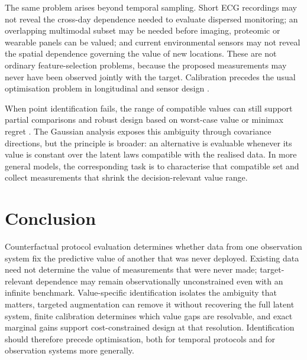 The same problem arises beyond temporal sampling. Short ECG recordings may not
reveal the cross-day dependence needed to evaluate dispersed monitoring; an
overlapping multimodal subset may be needed before imaging, proteomic or
wearable panels can be valued; and current environmental sensors may not reveal
the spatial dependence governing the value of new locations. These are not
ordinary feature-selection problems, because the proposed measurements may
never have been observed jointly with the target. Calibration precedes the
usual optimisation problem in longitudinal and sensor design
\citep{chaloner1995bayesian,ji2017optimal,krause2008near,joshi2009sensor}.

When point identification fails, the range of compatible values can still
support partial comparisons and robust design based on worst-case value or
minimax regret \citep{manski2003partial,tamer2010partial}. The Gaussian analysis
exposes this ambiguity through covariance directions, but the principle is
broader: an alternative is evaluable whenever its value is constant over the
latent laws compatible with the realised data. In more general models, the
corresponding task is to characterise that compatible set and collect
measurements that shrink the decision-relevant value range.

\section{Conclusion}

Counterfactual protocol evaluation determines whether data from one observation
system fix the predictive value of another that was never deployed. Existing
data need not determine the value of measurements that were never made;
target-relevant dependence may remain observationally unconstrained even with
an infinite benchmark. Value-specific identification isolates the ambiguity
that matters, targeted augmentation can remove it without recovering the full
latent system, finite calibration determines which value gaps are resolvable,
and exact marginal gains support cost-constrained design at that resolution.
Identification should therefore precede optimisation, both for temporal
protocols and for observation systems more generally.